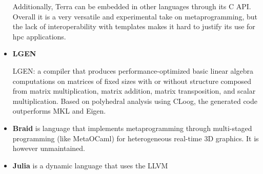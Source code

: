 \documentclass[../main]{subfiles}
\begin{document}
\begin{itemize}
Additionally, Terra can be embedded in other languages through its C API.
Overall it is a very versatile and experimental take on metaprogramming,
but the lack of interoperability with \cpp templates makes it hard to justify
its use for \gls{hpc} applications.

\item
\textbf{LGEN}

LGEN\cite{hpcs15}:
a compiler that produces performance-optimized
basic linear algebra computations on matrices
of fixed sizes with or without structure composed
from matrix multiplication, matrix addition, matrix
transposition, and scalar multiplication. Based on
polyhedral analysis using CLoog, the generated code
outperforms MKL and Eigen.


\item
\textbf{Braid} \cite{braid} is language that implements metaprogramming
through multi-staged programming (like MetaOCaml) for heterogeneous real-time
3D graphics. It is however unmaintained.

\item
\textbf{Julia} \cite{julia} is a dynamic language that uses the LLVM

\end{itemize}
\end{document}

